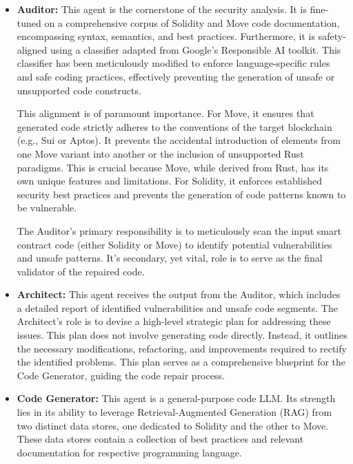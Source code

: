\begin{itemize}
    \item \textbf{Auditor:} This agent is the cornerstone of the security analysis. It is fine-tuned on a comprehensive corpus of Solidity and Move code documentation, encompassing syntax, semantics, and best practices. Furthermore, it is safety-aligned using a classifier adapted from Google's Responsible AI toolkit. This classifier has been meticulously modified to enforce language-specific rules and safe coding practices, effectively preventing the generation of unsafe or unsupported code constructs.  

    This alignment is of paramount importance. For Move, it ensures that generated code strictly adheres to the conventions of the target blockchain (e.g., Sui or Aptos). It prevents the accidental introduction of elements from one Move variant into another or the inclusion of unsupported Rust paradigms. This is crucial because Move, while derived from Rust, has its own unique features and limitations. For Solidity, it enforces established security best practices and prevents the generation of code patterns known to be vulnerable.

    The Auditor's primary responsibility is to meticulously scan the input smart contract code (either Solidity or Move) to identify potential vulnerabilities and unsafe patterns. It's secondary, yet vital, role is to serve as the final validator of the repaired code.
    \item \textbf{Architect:} This agent receives the output from the Auditor, which includes a detailed report of identified vulnerabilities and unsafe code segments. The Architect's role is to devise a high-level strategic plan for addressing these issues. This plan does not involve generating code directly. Instead, it outlines the necessary modifications, refactoring, and improvements required to rectify the identified problems. This plan serves as a comprehensive blueprint for the Code Generator, guiding the code repair process.
    \item \textbf{Code Generator:} This agent is a general-purpose code LLM. Its strength lies in its ability to leverage Retrieval-Augmented Generation (RAG) from two distinct data stores, one dedicated to Solidity and the other to Move. 
    These data stores contain a collection of best practices and relevant documentation for respective programming language. 


\end{itemize}
